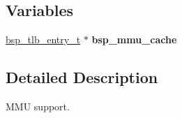 \subsection*{Variables}
\begin{DoxyCompactItemize}
\item 
\mbox{\label{group__Virtex5MMU_ga9b1be6b3e1758a8b21d3f472436669c1}} 
\mbox{\hyperlink{structbsp__tlb__entry__t}{bsp\+\_\+tlb\+\_\+entry\+\_\+t}} $\ast$ {\bfseries bsp\+\_\+mmu\+\_\+cache}
\end{DoxyCompactItemize}


\subsection{Detailed Description}
M\+MU support. 


